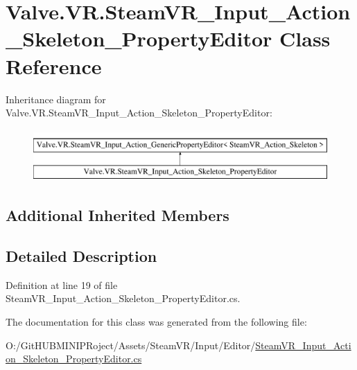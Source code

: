 \hypertarget{class_valve_1_1_v_r_1_1_steam_v_r___input___action___skeleton___property_editor}{}\section{Valve.\+V\+R.\+Steam\+V\+R\+\_\+\+Input\+\_\+\+Action\+\_\+\+Skeleton\+\_\+\+Property\+Editor Class Reference}
\label{class_valve_1_1_v_r_1_1_steam_v_r___input___action___skeleton___property_editor}
Inheritance diagram for Valve.\+V\+R.\+Steam\+V\+R\+\_\+\+Input\+\_\+\+Action\+\_\+\+Skeleton\+\_\+\+Property\+Editor\+:\begin{figure}[H]
\begin{center}
\leavevmode
\includegraphics[height=2.000000cm]{class_valve_1_1_v_r_1_1_steam_v_r___input___action___skeleton___property_editor}
\end{center}
\end{figure}
\subsection*{Additional Inherited Members}


\subsection{Detailed Description}


Definition at line 19 of file Steam\+V\+R\+\_\+\+Input\+\_\+\+Action\+\_\+\+Skeleton\+\_\+\+Property\+Editor.\+cs.



The documentation for this class was generated from the following file\+:\begin{DoxyCompactItemize}
\item 
O\+:/\+Git\+H\+U\+B\+M\+I\+N\+I\+P\+Roject/\+Assets/\+Steam\+V\+R/\+Input/\+Editor/\mbox{\hyperlink{_steam_v_r___input___action___skeleton___property_editor_8cs}{Steam\+V\+R\+\_\+\+Input\+\_\+\+Action\+\_\+\+Skeleton\+\_\+\+Property\+Editor.\+cs}}\end{DoxyCompactItemize}
